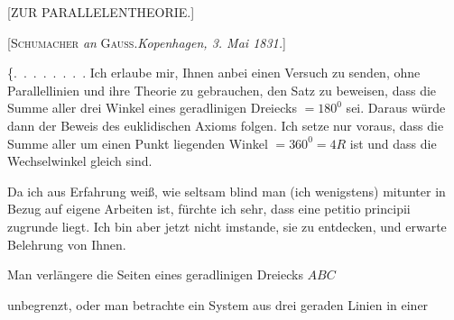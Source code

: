 

\clearpage
{}%
\begin{center}
[ZUR PARALLELENTHEORIE.]

[\textsc{Schumacher} \emph{an} \textsc{Gauss}.\quad \emph{Kopenhagen, 3. Mai 1831.}]
\end{center}

\{\mbox{.\ .\ .\ .\ .\ .\ .\ .} Ich erlaube mir, Ihnen anbei einen Versuch zu senden, ohne Parallellinien und ihre Theorie zu gebrauchen, den Satz zu beweisen, dass die Summe aller drei Winkel eines geradlinigen Dreiecks $= 180^{0}$ sei. Daraus würde dann der Beweis des euklidischen Axioms folgen. Ich setze nur voraus, dass die Summe aller um einen Punkt liegenden Winkel $= 360^{0} = 4R$ ist und dass die Wechselwinkel gleich sind.

Da ich aus Erfahrung weiß, wie seltsam blind man (ich wenigstens) mitunter in Bezug auf eigene Arbeiten ist, fürchte ich sehr, dass eine petitio principii zugrunde liegt. Ich bin aber jetzt nicht imstande, sie zu entdecken, und erwarte Belehrung von Ihnen.

\textls{[Beilage.]} Man verlängere die Seiten eines geradlinigen Dreiecks $ABC$

\begin{center}

\par [Fig. 1.]
\end{center}

\noindent unbegrenzt, oder man betrachte ein System aus drei geraden Linien in einer
